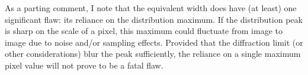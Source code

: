 \documentclass[11pt]{article}
\begin{document}
As a parting comment, I note that the equivalent width does have (at
least) one significant flaw: its reliance on the distribution maximum.
If the distribution peak is sharp on the scale of a pixel, this maximum
could fluctuate from image to image due to noise and/or sampling
effects. Provided that the diffraction limit (or other considerations)
blur the peak sufficiently, the reliance on a single maximum pixel value
will not prove to be a fatal flaw.


    
    
    
    
\end{document}
